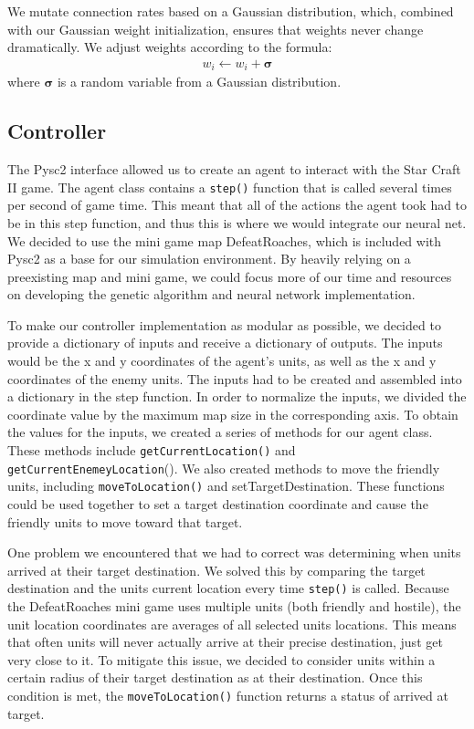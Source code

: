 \documentclass{article}
\begin{document}
\begin{multicols}{2}
We mutate connection rates based on a Gaussian distribution, which, combined
with our Gaussian weight initialization, ensures that weights never change
dramatically. We adjust weights according to the formula:
\begin{align}
  w_i \leftarrow w_i + \bm{\sigma}
\end{align}
where $\bm{\sigma}$ is a random variable from a Gaussian distribution.

\subsection{Controller}

The Pysc2 interface allowed us to create an agent to interact with the Star
Craft II game.  The agent class contains a \texttt{step()} function that is called
several times per second of game time. This meant that all of the actions the
agent took had to be in this step function, and thus this is where we would
integrate our neural net.  We decided to use the mini game map DefeatRoaches,
which is included with Pysc2 as a base for our simulation environment. By
heavily relying on a preexisting map and mini game, we could focus more of our
time and resources on developing the genetic algorithm and neural network
implementation.

To make our controller implementation as modular as possible, we decided to
provide a dictionary of inputs and receive a dictionary of outputs. The inputs
would be the x and y coordinates of the agent’s units, as well as the x and y
coordinates of the enemy units. The inputs had to be created and assembled into
a dictionary in the step function.  In order to normalize the inputs, we divided
the coordinate value by the maximum map size in the corresponding axis.  To
obtain the values for the inputs, we created a series of methods for our agent
class.  These methods include \texttt{getCurrentLocation()} and
\texttt{getCurrentEnemeyLocation}().  We also created methods to move the friendly units,
including \texttt{moveToLocation()} and setTargetDestination.  These functions could be
used together to set a target destination coordinate and cause the friendly
units to move toward that target.

One problem we encountered that we had to correct was determining when units
arrived at their target destination.  We solved this by comparing the target
destination and the units current location every time \texttt{step()} is called.  Because
the DefeatRoaches mini game uses multiple units (both friendly and hostile), the
unit location coordinates are averages of all selected units locations.  This
means that often units will never actually arrive at their precise destination,
just get very close to it.  To mitigate this issue, we decided to consider units
within a certain radius of their target destination as at their destination.
Once this condition is met, the \texttt{moveToLocation()} function returns a status of
arrived at target.


\end{multicols}
\end{document}
